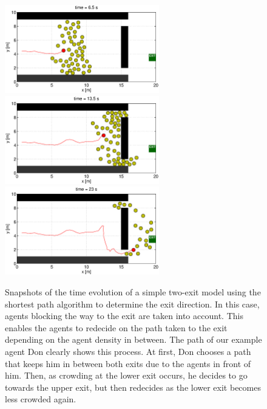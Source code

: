 \documentclass[11pt]{article}
\begin{document}
\begin{figure}
	\centering
	\includegraphics[width=0.6\textwidth]{figures/TwoExitsShortestPathWithAgents_000650.eps}
	\qquad
	\includegraphics[width=0.6\textwidth]{figures/TwoExitsShortestPathWithAgents_001350.eps}
	\qquad
	\includegraphics[width=0.6\textwidth]{figures/TwoExitsShortestPathWithAgents_002300.eps}
	\caption{Snapshots of the time evolution of a simple two-exit model using the shortest path algorithm to determine the exit direction. In this case, agents blocking the way to the exit are taken into account. This enables the agents to redecide on the path taken to the exit depending on the agent density in between. The path of our example agent Don clearly shows this process. At first, Don chooses a path that keeps him in between both exits due to the agents in front of him. Then, as crowding at the lower exit occurs, he decides to go towards the upper exit, but then redecides as the lower exit becomes less crowded again.}
	\label{fig:two_exits2}
\end{figure}
\end{document}
